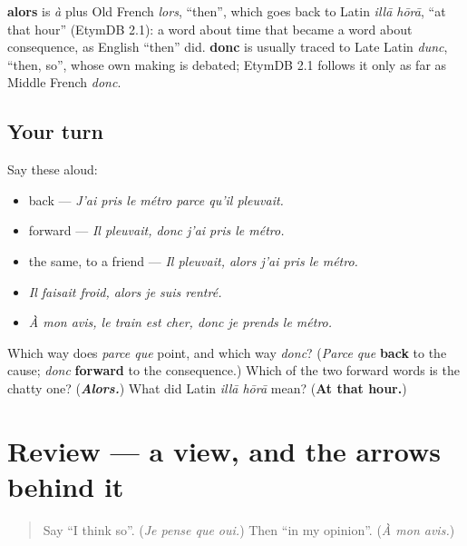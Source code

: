 \begin{cousinweb}
\textbf{alors} is \emph{à} plus Old French \emph{lors}, \textquotedblleft{}then\textquotedblright{}, which goes back to Latin \emph{illā hōrā}, \textquotedblleft{}at that hour\textquotedblright{} (EtymDB 2.1): a word about time that became a word about consequence, as English \textquotedblleft{}then\textquotedblright{} did. \textbf{donc} is usually traced to Late Latin \emph{dunc}, \textquotedblleft{}then, so\textquotedblright{}, whose own making is debated; EtymDB 2.1 follows it only as far as Middle French \emph{donc}.
\end{cousinweb}

\subsection*{Your turn}
Say these aloud:

\begin{itemize}
\raggedright
  \item back — \emph{J'ai pris le métro parce qu'il pleuvait.}
  \item forward — \emph{Il pleuvait, donc j'ai pris le métro.}
  \item the same, to a friend — \emph{Il pleuvait, alors j'ai pris le métro.}
  \item \emph{Il faisait froid, alors je suis rentré.}
  \item \emph{À mon avis, le train est cher, donc je prends le métro.}
\end{itemize}

\begin{tcolorbox}[breakable,colback=teal!4,colframe=teal!35!black,title={Before you move on}]
Which way does \emph{parce que} point, and which way \emph{donc}? (\emph{Parce que} \textbf{back} to the cause; \emph{donc} \textbf{forward} to the consequence.) Which of the two forward words is the chatty one? (\emph{\textbf{Alors.}}) What did Latin \emph{illā hōrā} mean? (\textbf{At that hour.})
\end{tcolorbox}
\section[(review)]{Review — a view, and the arrows behind it}

\label{lesson:FR-C260-revision-opinion}



\begin{quote}
Say \textquotedblleft{}I think so\textquotedblright{}. (\emph{Je pense que oui.}) Then \textquotedblleft{}in my opinion\textquotedblright{}. (\emph{À mon avis.})
\end{quote}


